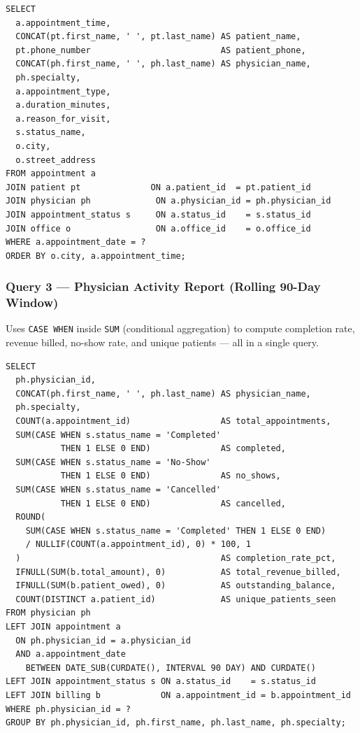 \documentclass[12pt, letterpaper]{article}
\begin{document}
\begin{lstlisting}[language=MySQL, caption={Query 2: Daily Appointment Schedule}]
SELECT
  a.appointment_time,
  CONCAT(pt.first_name, ' ', pt.last_name) AS patient_name,
  pt.phone_number                          AS patient_phone,
  CONCAT(ph.first_name, ' ', ph.last_name) AS physician_name,
  ph.specialty,
  a.appointment_type,
  a.duration_minutes,
  a.reason_for_visit,
  s.status_name,
  o.city,
  o.street_address
FROM appointment a
JOIN patient pt              ON a.patient_id  = pt.patient_id
JOIN physician ph             ON a.physician_id = ph.physician_id
JOIN appointment_status s     ON a.status_id    = s.status_id
JOIN office o                 ON a.office_id    = o.office_id
WHERE a.appointment_date = ?
ORDER BY o.city, a.appointment_time;
\end{lstlisting}

\subsubsection{Query 3 — Physician Activity Report (Rolling 90-Day Window)}

Uses \texttt{CASE WHEN} inside \texttt{SUM} (conditional aggregation) to compute completion rate, revenue billed, no-show rate, and unique patients — all in a single query.

\begin{lstlisting}[language=MySQL, caption={Query 3: Physician Activity Report}]
SELECT
  ph.physician_id,
  CONCAT(ph.first_name, ' ', ph.last_name) AS physician_name,
  ph.specialty,
  COUNT(a.appointment_id)                  AS total_appointments,
  SUM(CASE WHEN s.status_name = 'Completed'
           THEN 1 ELSE 0 END)              AS completed,
  SUM(CASE WHEN s.status_name = 'No-Show'
           THEN 1 ELSE 0 END)              AS no_shows,
  SUM(CASE WHEN s.status_name = 'Cancelled'
           THEN 1 ELSE 0 END)              AS cancelled,
  ROUND(
    SUM(CASE WHEN s.status_name = 'Completed' THEN 1 ELSE 0 END)
    / NULLIF(COUNT(a.appointment_id), 0) * 100, 1
  )                                        AS completion_rate_pct,
  IFNULL(SUM(b.total_amount), 0)           AS total_revenue_billed,
  IFNULL(SUM(b.patient_owed), 0)           AS outstanding_balance,
  COUNT(DISTINCT a.patient_id)             AS unique_patients_seen
FROM physician ph
LEFT JOIN appointment a
  ON ph.physician_id = a.physician_id
  AND a.appointment_date
    BETWEEN DATE_SUB(CURDATE(), INTERVAL 90 DAY) AND CURDATE()
LEFT JOIN appointment_status s ON a.status_id    = s.status_id
LEFT JOIN billing b            ON a.appointment_id = b.appointment_id
WHERE ph.physician_id = ?
GROUP BY ph.physician_id, ph.first_name, ph.last_name, ph.specialty;
\end{lstlisting}
\end{document}
